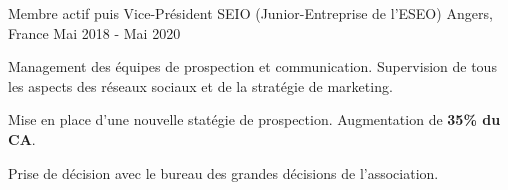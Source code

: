 

\begin{cventries}

  \cventry
    {Membre actif puis Vice-Président} %
    {SEIO (Junior-Entreprise de l'ESEO)} %
    {Angers, France} %
    {Mai 2018 - Mai 2020} %
    {
      \begin{cvitems} %
        \item {Management des équipes de prospection et communication. Supervision de tous les aspects des réseaux sociaux et de la stratégie de marketing.}
        \item {Mise en place d'une nouvelle statégie de prospection. Augmentation de \textbf{35\% du CA}.}
        \item {Prise de décision avec le bureau des grandes décisions de l'association.}
      \end{cvitems}
    }

\end{cventries}
